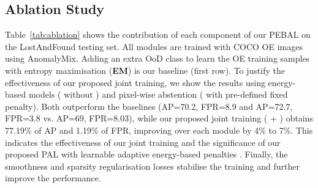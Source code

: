 \documentclass[runningheads]{llncs}
\begin{document}
\vspace{-10pt}
\subsection{Ablation Study}
Table~\ref{tab:ablation} shows the contribution of each component of our PEBAL on the LostAndFound testing set. All modules are trained with COCO OE images using AnomalyMix.   
Adding an extra OoD class to learn the OE training samples with entropy maximisation (\textbf{EM}) is our baseline (first row). To justify the effectiveness of our proposed joint training, we show the results using 
energy-based models ( without ) and pixel-wise abstention ( with pre-defined fixed penalty). Both outperform the baselines (AP=70.2, FPR=8.9 and AP=72.7, FPR=3.8 vs. AP=69, FPR=8.03), while our proposed joint training ( + ) obtains 77.19\% of AP and 1.19\% of FPR, improving over each module by 4\% to 7\%. This indicates the effectiveness of our joint training and the significance of our proposed PAL with learnable adaptive energy-based penalties . Finally, the smoothness and sparsity regularisation losses stabilise the training and further improve the performance. 





\begin{table}[t!]
\centering
\caption{Ablation studies for anomaly segmentation on \textbf{LostAndFound}, with \textbf{WideResnet38} backbone, where all proposed modules are trained with COCO OE images with AnomalyMix. EM denotes the baseline method that adds an extra OoD class to learn the OE training samples with entropy maximisation (first row).  }
\label{tab:ablation}
\vspace{-20pt}
\end{table}
\end{document}
